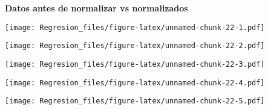 \documentclass[]{article}
\newenvironment{Shaded}{\begin{snugshade}}{\end{snugshade}}
\newcommand{\DataTypeTok}[1]{\textcolor[rgb]{0.13,0.29,0.53}{#1}}
\newcommand{\KeywordTok}[1]{\textcolor[rgb]{0.13,0.29,0.53}{\textbf{#1}}}
\newcommand{\NormalTok}[1]{#1}
\newcommand{\OperatorTok}[1]{\textcolor[rgb]{0.81,0.36,0.00}{\textbf{#1}}}
\newcommand{\StringTok}[1]{\textcolor[rgb]{0.31,0.60,0.02}{#1}}
\begin{document}
\textbf{Datos antes de normalizar vs normalizados}

\begin{Shaded}
\end{Shaded}

\texttt{[image: Regresion\_files/figure-latex/unnamed-chunk-22-1.pdf]}

\begin{Shaded}
\end{Shaded}

\texttt{[image: Regresion\_files/figure-latex/unnamed-chunk-22-2.pdf]}

\begin{Shaded}
\end{Shaded}

\texttt{[image: Regresion\_files/figure-latex/unnamed-chunk-22-3.pdf]}

\begin{Shaded}
\end{Shaded}

\texttt{[image: Regresion\_files/figure-latex/unnamed-chunk-22-4.pdf]}

\begin{Shaded}
\end{Shaded}

\texttt{[image: Regresion\_files/figure-latex/unnamed-chunk-22-5.pdf]}
\end{document}

